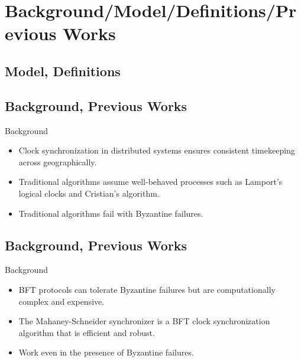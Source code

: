 \documentclass[11pt]{beamer}              %
\begin{document}
\section{Background/Model/Definitions/Previous Works}


\subsection{Model, Definitions}


\subsection{Background, Previous Works}
\begin{frame}{Background}
\begin{itemize}
  \item Clock synchronization in distributed systems ensures consistent timekeeping across geographically.
  \item Traditional algorithms assume well-behaved processes such as Lamport's logical clocks and Cristian's algorithm.
  \item Traditional algorithms fail with Byzantine failures.
\end{itemize}
\end{frame}

\subsection{Background, Previous Works}
\begin{frame}{Background}
\begin{itemize}
  \item BFT protocols can tolerate Byzantine failures but are computationally complex and expensive.
  \item The Mahaney-Schneider synchronizer is a BFT clock synchronization algorithm that is efficient and robust.
  \item Work even in the presence of Byzantine failures.
\end{itemize}
\end{frame}
\end{document}
